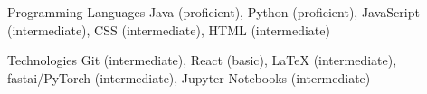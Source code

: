 


\begin{cvskills}


\cvskill
{Programming Languages} %
{Java (proficient), Python (proficient), JavaScript (intermediate), CSS (intermediate), HTML (intermediate)} %



\cvskill
{Technologies} %
{Git (intermediate), React (basic), \textrm{\LaTeX} (intermediate),
fastai/PyTorch (intermediate), Jupyter Notebooks (intermediate)} %





\end{cvskills}